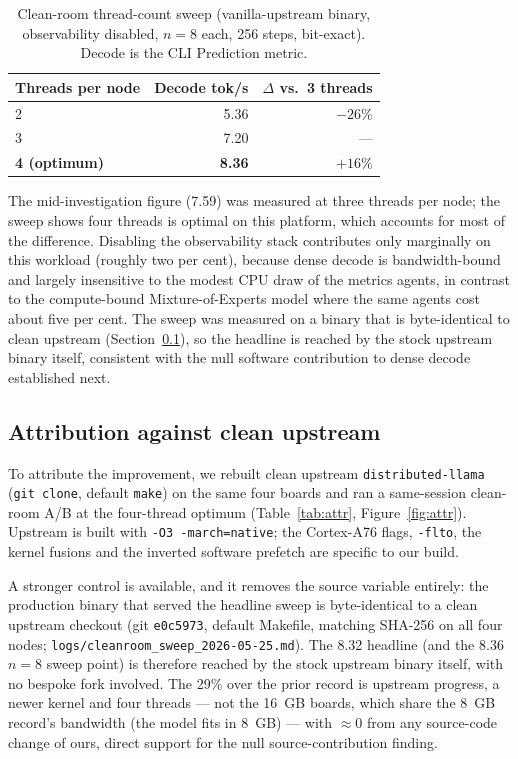 \documentclass[10pt,a4paper]{article}
\begin{document}
\begin{table}[H]
\centering\small
\caption{Clean-room thread-count sweep (vanilla-upstream binary, observability disabled, $n{=}8$ each, 256 steps, bit-exact). Decode is the CLI Prediction metric.}
\label{tab:ntsweep}
\begin{tabular}{@{}lrr@{}}
\toprule
\textbf{Threads per node} & \textbf{Decode tok/s} & \textbf{$\Delta$ vs.\ 3 threads} \\
\midrule
2 & 5.36 & $-26\%$ \\
3 & 7.20 & --- \\
\textbf{4 (optimum)} & \textbf{8.36} & $+16\%$ \\
\bottomrule
\end{tabular}
\end{table}

The mid-investigation figure (7.59) was measured at three threads per node; the sweep shows four threads is optimal on this platform, which accounts for most of the difference. Disabling the observability stack contributes only marginally on this workload (roughly two per cent), because dense decode is bandwidth-bound and largely insensitive to the modest CPU draw of the metrics agents, in contrast to the compute-bound Mixture-of-Experts model where the same agents cost about five per cent. The sweep was measured on a binary that is byte-identical to clean upstream (Section~\ref{sec:attribution}), so the headline is reached by the stock upstream binary itself, consistent with the null software contribution to dense decode established next.

\subsection{Attribution against clean upstream}
\label{sec:attribution}
To attribute the improvement, we rebuilt clean upstream \texttt{distributed-llama} (\texttt{git clone}, default \texttt{make}) on the same four boards and ran a same-session clean-room A/B at the four-thread optimum (Table~\ref{tab:attr}, Figure~\ref{fig:attr}). Upstream is built with \texttt{-O3 -march=native}; the Cortex-A76 flags, \texttt{-flto}, the kernel fusions and the inverted software prefetch are specific to our build.

A stronger control is available, and it removes the source variable entirely: the production binary that served the headline sweep is byte-identical to a clean upstream checkout (git \texttt{e0c5973}, default Makefile, matching SHA-256 on all four nodes; \texttt{logs/cleanroom\_sweep\_2026-05-25.md}). The 8.32 headline (and the 8.36 $n{=}8$ sweep point) is therefore reached by the stock upstream binary itself, with no bespoke fork involved. The 29\% over the prior record is upstream progress, a newer kernel and four threads --- not the 16~GB boards, which share the 8~GB record's bandwidth (the model fits in 8~GB) --- with $\approx$0 from any source-code change of ours, direct support for the null source-contribution finding.
\end{document}
